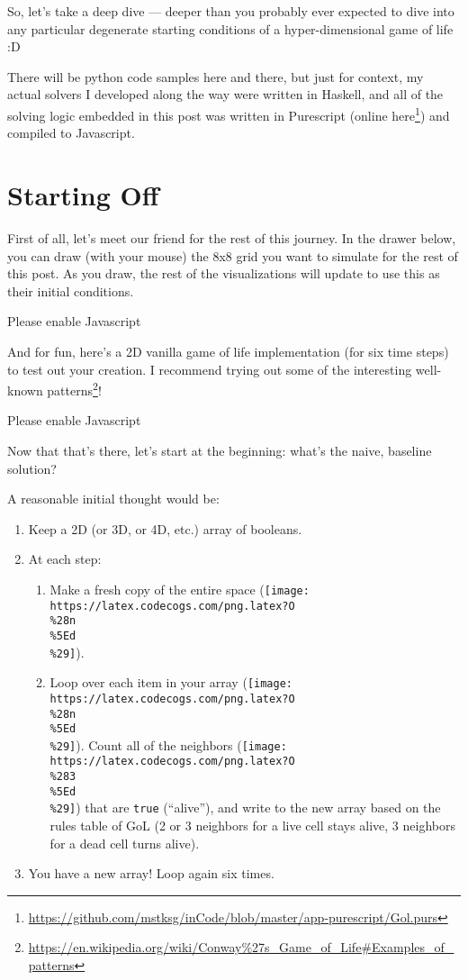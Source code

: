 \documentclass[]{article}
\renewcommand{\href}[2]{#2\footnote{\url{#1}}}
\begin{document}
So, let's take a deep dive --- deeper than you probably ever expected to dive
into any particular degenerate starting conditions of a hyper-dimensional game
of life :D

There will be python code samples here and there, but just for context, my
actual solvers I developed along the way were written in Haskell, and all of the
solving logic embedded in this post was written in Purescript
(\href{https://github.com/mstksg/inCode/blob/master/app-purescript/Gol.purs}{online
here}) and compiled to Javascript.

\hypertarget{starting-off}{%
\section{Starting Off}\label{starting-off}}

First of all, let's meet our friend for the rest of this journey. In the drawer
below, you can draw (with your mouse) the 8x8 grid you want to simulate for the
rest of this post. As you draw, the rest of the visualizations will update to
use this as their initial conditions.

\leavevmode\hypertarget{golDrawer}{}%
Please enable Javascript

And for fun, here's a 2D vanilla game of life implementation (for six time
steps) to test out your creation. I recommend trying out some of the
\href{https://en.wikipedia.org/wiki/Conway\%27s_Game_of_Life\#Examples_of_patterns}{interesting
well-known patterns}!

\leavevmode\hypertarget{gol2D}{}%
Please enable Javascript

Now that that's there, let's start at the beginning: what's the naive, baseline
solution?

A reasonable initial thought would be:

\begin{enumerate}
\def\labelenumi{\arabic{enumi}.}
\tightlist
\item
  Keep a 2D (or 3D, or 4D, etc.) array of booleans.
\item
  At each step:

  \begin{enumerate}
  \def\labelenumii{\alph{enumii}.}
  \tightlist
  \item
    Make a fresh copy of the entire space
    (\texttt{[image: https://latex.codecogs.com/png.latex?O\\\%28n\\\%5Ed\\\%29]}).
  \item
    Loop over each item in your array
    (\texttt{[image: https://latex.codecogs.com/png.latex?O\\\%28n\\\%5Ed\\\%29]}).
    Count all of the neighbors
    (\texttt{[image: https://latex.codecogs.com/png.latex?O\\\%283\\\%5Ed\\\%29]})
    that are \texttt{true} (``alive''), and write to the new array based on the
    rules table of GoL (2 or 3 neighbors for a live cell stays alive, 3
    neighbors for a dead cell turns alive).
  \end{enumerate}
\item
  You have a new array! Loop again six times.
\end{enumerate}
\end{document}
